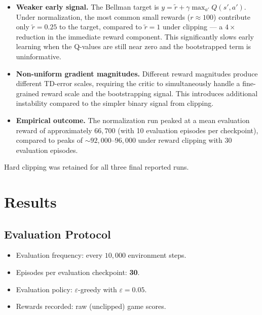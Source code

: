 \documentclass[11pt,a4paper]{article}
\begin{document}
\begin{itemize}
  \item \textbf{Weaker early signal.}
        The Bellman target is $y = \tilde{r} + \gamma\max_{a'}Q(s',a')$.
        Under normalization, the most common small rewards ($r\approx100$)
        contribute only $\tilde{r}=0.25$ to the target, compared to
        $\tilde{r}=1$ under clipping --- a $4\times$ reduction in the
        immediate reward component.
        This significantly slows early learning when the Q-values are
        still near zero and the bootstrapped term is uninformative.

  \item \textbf{Non-uniform gradient magnitudes.}
        Different reward magnitudes produce different TD-error scales,
        requiring the critic to simultaneously handle a fine-grained reward
        scale and the bootstrapping signal.
        This introduces additional instability compared to the simpler
        binary signal from clipping.

  \item \textbf{Empirical outcome.}
        The normalization run peaked at a mean evaluation reward of
        approximately $66{,}700$ (with 10 evaluation episodes per
        checkpoint), compared to peaks of ${\sim}92{,}000$--$96{,}000$
        under reward clipping with 30 evaluation episodes.
\end{itemize}

Hard clipping was retained for all three final reported runs.

\section{Results}

\subsection{Evaluation Protocol}

\begin{itemize}
  \item Evaluation frequency: every $10{,}000$ environment steps.
  \item Episodes per evaluation checkpoint: \textbf{30}.
  \item Evaluation policy: $\varepsilon$-greedy with $\varepsilon=0.05$.
  \item Rewards recorded: raw (unclipped) game scores.
\end{itemize}
\end{document}
